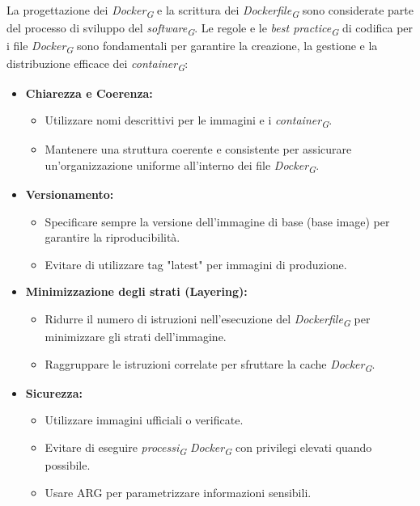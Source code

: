 La progettazione dei \textit{Docker}\textsubscript{\textit{G}} e la scrittura dei \textit{Dockerfile}\textsubscript{\textit{G}} sono considerate parte del processo di sviluppo del \textit{software}\textsubscript{\textit{G}}.
Le regole e le \textit{best practice}\textsubscript{\textit{G}} di codifica per i file \textit{Docker}\textsubscript{\textit{G}} sono fondamentali per garantire la creazione, la gestione e la distribuzione efficace dei \textit{container}\textsubscript{\textit{G}}:
\begin{itemize}
    \item \textbf{Chiarezza e Coerenza:}
    \begin{itemize}
        \item Utilizzare nomi descrittivi per le immagini e i \textit{container}\textsubscript{\textit{G}}.
        \item Mantenere una struttura coerente e consistente per assicurare un'organizzazione uniforme all'interno dei file \textit{Docker}\textsubscript{\textit{G}}.
    \end{itemize}

\item \textbf{Versionamento:}
    \begin{itemize}
        \item Specificare sempre la versione dell'immagine di base (base image) per garantire la riproducibilità.
        \item Evitare di utilizzare tag "latest" per immagini di produzione.
    \end{itemize}

\item \textbf{Minimizzazione degli strati (Layering):}
    \begin{itemize}
        \item Ridurre il numero di istruzioni nell'esecuzione del \textit{Dockerfile}\textsubscript{\textit{G}} per minimizzare gli strati dell'immagine.
        \item Raggruppare le istruzioni correlate per sfruttare la cache \textit{Docker}\textsubscript{\textit{G}}.
    \end{itemize}

\item \textbf{Sicurezza:}
    \begin{itemize}
        \item Utilizzare immagini ufficiali o verificate.
        \item Evitare di eseguire \textit{processi}\textsubscript{\textit{G}} \textit{Docker}\textsubscript{\textit{G}} con privilegi elevati quando possibile.
        \item Usare ARG per parametrizzare informazioni sensibili.
    \end{itemize}


\end{itemize}
